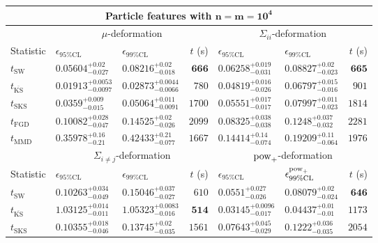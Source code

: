 \begin{tabular}{l|llr|llr}
	\toprule
	\multicolumn{7}{c}{{\bf Particle features with $\mathbf{n=m=10^{4}}$}} \\
	\toprule
	\multicolumn{1}{c}{} & \multicolumn{3}{c}{$\mu$-deformation} & \multicolumn{3}{c}{$\Sigma_{ii}$-deformation} \\
	Statistic & $\epsilon_{95\%\mathrm{CL}}$ & $\epsilon_{99\%\mathrm    {CL}}$ & $t$ (s) & $\epsilon_{95\%\mathrm{CL}}$ & $\epsilon_{99\%\mathrm{CL}}$ & $t$ (s) \\
	\midrule
	$t_{\mathrm{SW}}$ & $0.05604_{-0.027}^{+0.02}$ & $0.08216_{-0.018}^{+0.02}$ & ${\mathbf{666}}$ & $0.06258_{-0.031}^{+0.019}$ & $0.08827_{-0.023}^{+0.02}$ & ${\mathbf{665}}$ \\
	$t_{\overline{\mathrm{KS}}}$ & ${\mathbf{0.01913_{-0.0097}^{+0.0053}}}$ & ${\mathbf{0.02873_{-0.0066}^{+0.0044}}}$ & $780$ & ${\mathbf{0.04819_{-0.026}^{+0.016}}}$ & ${\mathbf{0.06797_{-0.016}^{+0.015}}}$ & $901$ \\
	$t_{\mathrm{SKS}}$ & $0.0359_{-0.015}^{+0.009}$ & $0.05064_{-0.0091}^{+0.011}$ & $1700$ & $0.05551_{-0.017}^{+0.017}$ & $0.07997_{-0.023}^{+0.011}$ & $1814$ \\
	$t_{\mathrm{FGD}}$ & $0.10082_{-0.047}^{+0.028}$ & $0.14525_{-0.026}^{+0.02}$ & $2099$ & $0.08325_{-0.038}^{+0.038}$ & $0.1248_{-0.032}^{+0.037}$ & $2281$ \\
	$t_{\mathrm{MMD}}$ & $0.35978_{-0.21}^{+0.16}$ & $0.42433_{-0.077}^{+0.21}$ & $1667$ & $0.14414_{-0.074}^{+0.14}$ & $0.19209_{-0.064}^{+0.11}$ & $1976$ \\
	\toprule
	\multicolumn{1}{c}{} & \multicolumn{3}{c}{$\Sigma_{i\neq j}$-deformation} & \multicolumn{3}{c}{$\rm{pow}_{+}$-deformation} \\
	Statistic & $\epsilon_{95\%\mathrm{CL}}$ & $\epsilon_{99\%\mathrm{CL}}$ & $t$ (s) & $\epsilon_{95\%\mathrm{CL}}$ & $\epsilon^{\rm   {pow}_{+}}_{99\%\mathrm{CL}}$ & $t$ (s) \\
	\midrule
	$t_{\mathrm{SW}}$ & $0.10263_{-0.049}^{+0.034}$ & $0.15046_{-0.027}^{+0.037}$ & $610$ & $0.0551_{-0.026}^{+0.027}$ & $0.08079_{-0.024}^{+0.02}$ & ${\mathbf{646}}$ \\
	$t_{\overline{\mathrm{KS}}}$ & $1.03125_{-0.011}^{+0.014}$ & $1.05323_{-0.016}^{+0.0083}$ & ${\mathbf{514}}$ & ${\mathbf{0.03145_{-0.017}^{+0.0096}}}$ & ${\mathbf{0.04437_{-0.01}^{+0.01}}}$ & $1173$ \\
	$t_{\mathrm{SKS}}$ & $0.10355_{-0.046}^{+0.018}$ & $0.13745_{-0.035}^{+0.02}$ & $1561$ & $0.07643_{-0.029}^{+0.045}$ & $0.1222_{-0.035}^{+0.036}$ & $2054$ \\

\end{tabular}
